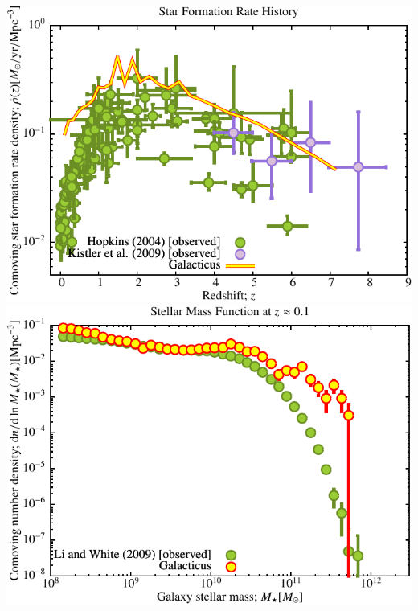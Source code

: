 \includegraphics[scale=0.6]{r256/h100/NGenIC_26214/Plot_Star_Formation_History.pdf} 
\includegraphics[scale=0.6]{r256/h100/NGenIC_26214/Plot_Stellar_Mass_Function.pdf} \\
